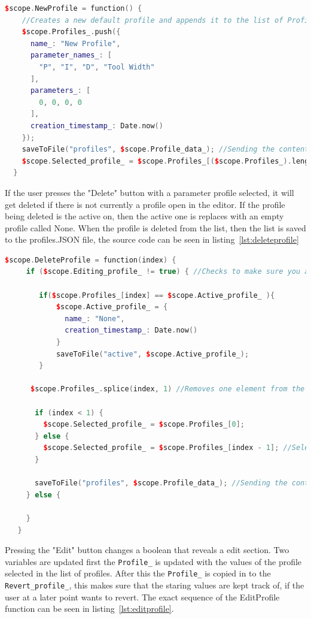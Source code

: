 \begin{lstlisting}[caption = {NewProfile function in editParam.js}, captionpos=b, label={lst:newprofile}, language=C++,firstnumber=1]
 $scope.NewProfile = function() {
    //Creates a new default profile and appends it to the list of Profiles_
    $scope.Profiles_.push({
      name_: "New Profile",
      parameter_names_: [
        "P", "I", "D", "Tool Width"
      ],
      parameters_: [
        0, 0, 0, 0
      ],
      creation_timestamp_: Date.now()
    });
    saveToFile("profiles", $scope.Profile_data_); //Sending the content to the server to get saved.
    $scope.Selected_profile_ = $scope.Profiles_[($scope.Profiles_).length - 1]; // Selects the new profile in the ui
  }
\end{lstlisting}

If the user presses the "Delete" button with a parameter profile selected, it will get deleted if there is not currently a profile open in the editor. If the profile being deleted is the active on, then the active one is replaces with an empty profile called None. When the profile is deleted from the list, then the list is saved to the profiles.JSON file, the source code can be seen in listing~\ref{lst:deleteprofile}

\begin{lstlisting}[caption = {DeleteProfile function in editParam.js}, captionpos=b, label={lst:deleteprofile}, language=C++,firstnumber=1]
 $scope.DeleteProfile = function(index) {
     if ($scope.Editing_profile_ != true) { //Checks to make sure you are not deleting the profile that's currently being edited
 
 		if($scope.Profiles_[index] == $scope.Active_profile_ ){
 			$scope.Active_profile_ = {
 		      name_: "None",
 		      creation_timestamp_: Date.now()
 		    }
 			saveToFile("active", $scope.Active_profile_);
 		}
 
 	  $scope.Profiles_.splice(index, 1) //Removes one element from the list at index
 
       if (index < 1) {
         $scope.Selected_profile_ = $scope.Profiles_[0];
       } else {
         $scope.Selected_profile_ = $scope.Profiles_[index - 1]; //Selects the profile under the one deleted.
       }
 
       saveToFile("profiles", $scope.Profile_data_); //Sending the content to the server to get saved.
     } else {
 
     }
   }
\end{lstlisting}

Pressing the "Edit" button changes a boolean that reveals a edit section. Two variables are updated first the \texttt{Profile\_} is updated with the values of the profile selected in the list of profiles. After this the \texttt{Profile_} is copied in to the \texttt{Revert\_profile\_}, this makes sure that the staring values are kept track of, if the user at a later point wants to revert. The exact sequence of the EditProfile function can be seen in listing~\ref{lst:editprofile}.

